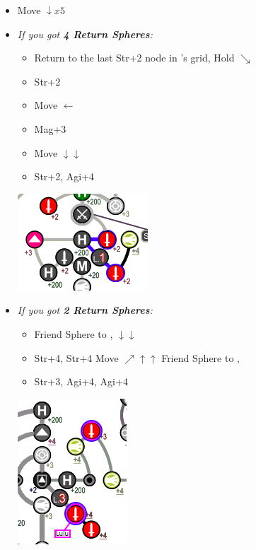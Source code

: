 \begin{spheregrid}
\begin{multicols}{2}
\begin{itemize}
      \rikkuf
      \begin{itemize}
      	\item Move $\downarrow x5$
      	\end{itemize}
      \yunaf
      \begin{itemize}
        \item \textit{If you got \textbf{4 Return Spheres}:}
              \begin{itemize}
                \item Return to the last Str+2 node in \wakka's grid, Hold $\searrow$
                \item Str+2
                \item Move $\leftarrow$
                \item Mag+3
                \item Move $\downarrow\downarrow$
                \item Str+2, Agi+4
              \end{itemize}
              \includegraphics[width=.5\columnwidth]{graphics/4_returns}
              \columnbreak
        \item \textit{If you got \textbf{2 Return Spheres}:}
              \begin{itemize}
                \item Friend Sphere to \lulu,  $\downarrow\downarrow$
                \item Str+4, Str+4
                      \luluf Move $\nearrow\uparrow\uparrow$
                      \yunaf Friend Sphere to \lulu,
                \item Str+3, Agi+4, Agi+4
              \end{itemize}
              \includegraphics[width=.4\columnwidth]{graphics/2_and_2}

\end{itemize}
\end{itemize}
\end{multicols}
\end{spheregrid}
